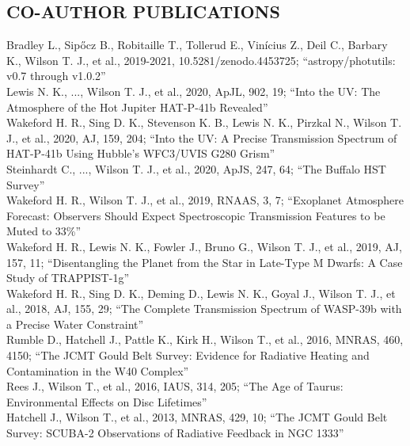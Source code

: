 \documentclass[letter, margin, 10pt]{res} %
\begin{document}
\begin{resume}
\section{CO-AUTHOR PUBLICATIONS}
Bradley L., Sip\H{o}cz B., Robitaille T., Tollerud E., Vinícius Z., Deil C., Barbary K., Wilson T. J., et al., 2019-2021, 10.5281/zenodo.4453725; ``astropy/photutils: v0.7 through v1.0.2''\vspace{2pt}\\
Lewis N. K., ..., Wilson T. J., et al., 2020, ApJL, 902, 19; ``Into the UV: The Atmosphere of the Hot Jupiter HAT-P-41b Revealed''\vspace{2pt}\\
Wakeford H. R., Sing D. K., Stevenson K. B., Lewis N. K., Pirzkal N., Wilson T. J., et al., 2020, AJ, 159, 204; ``Into the UV: A Precise Transmission Spectrum of HAT-P-41b Using Hubble's WFC3/UVIS G280 Grism''\vspace{2pt}\\
Steinhardt C., ..., Wilson T. J., et al., 2020, ApJS, 247, 64; ``The Buffalo HST Survey''\vspace{2pt}\\
Wakeford H. R., Wilson T. J., et al., 2019, RNAAS, 3, 7; ``Exoplanet Atmosphere Forecast: Observers Should Expect Spectroscopic Transmission Features to be Muted to 33\%''\vspace{2pt}\\
Wakeford H. R., Lewis N. K., Fowler J., Bruno G., Wilson T. J., et al., 2019, AJ, 157, 11; ``Disentangling the Planet from the Star in Late-Type M Dwarfs: A Case Study of TRAPPIST-1g''\vspace{2pt}\\
Wakeford H. R., Sing D. K., Deming D., Lewis N. K., Goyal J., Wilson T. J., et al., 2018, AJ, 155, 29; ``The Complete Transmission Spectrum of WASP-39b with a Precise Water Constraint''\vspace{2pt}\\
Rumble D., Hatchell J., Pattle K., Kirk H., Wilson T., et al., 2016, MNRAS, 460, 4150; ``The JCMT Gould Belt Survey: Evidence for Radiative Heating and Contamination in the W40 Complex''\vspace{2pt}\\
Rees J., Wilson T., et al., 2016, IAUS, 314, 205; ``The Age of Taurus: Environmental Effects on Disc Lifetimes''\vspace{2pt}\\
Hatchell J., Wilson T., et al., 2013, MNRAS, 429, 10; ``The JCMT Gould Belt Survey: SCUBA-2 Observations of Radiative Feedback in NGC 1333''


\end{resume}
\end{document}
